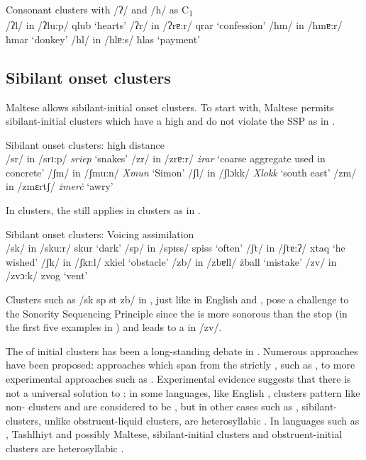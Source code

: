 \documentclass[output=paper]{langsci/langscibook}
\begin{document}
\ea\label{ex:galea:4a}
{Consonant clusters with /ʔ/ and /h/ as C\textsubscript{1}}\\
\ea
/ʔl/ in /ʔlu:p/ qlub ‘hearts’
\ex
/ʔr/ in /ʔrɐ:r/ qrar ‘confession’
\ex
/hm/ in /hmɐ:r/ ħmar ‘donkey’
\ex
/hl/ in /hlɐ:s/ ħlas ‘payment’ 
\z
\z

\subsection{Sibilant onset clusters}
Maltese allows sibilant-initial onset clusters. To start with, Maltese permits sibi\-lant-initial clusters which have a high  and do not violate the SSP as in .


\ea\label{ex:galea:4}
{Sibilant onset clusters: high  distance}\\
\ea
/sr/ in /srɪ:p/ \textit{sriep} ‘snakes’
\ex
/zr/ in /zrɐ:r/ \textit{żrar} ‘coarse aggregate used in concrete’ 
\ex
/ʃm/ in /ʃmu:n/ \textit{Xmun} ‘Simon’
\ex
/ʃl/ in /ʃlɔkk/ \textit{Xlokk} ‘south east’ 
\ex
/zm/ in /zmɛrtʃ/ \textit{żmer\.c} ‘awry’
\z
\z

In   clusters, the  still applies in  clusters as in .

\largerpage
\ea\label{ex:galea:5}
{Sibilant onset clusters: Voicing assimilation}\\
\ea
/sk/ in /sku:r/ skur ‘dark’
\ex
/sp/ in /spɪss/ spiss ‘often’
\ex
/ʃt/ in  /ʃtɐ:ʔ/  xtaq ‘he wished’
\ex
/ʃk/ in /ʃkɪ:l/ xkiel ‘obstacle’
\ex
/zb/ in /zbɐll/ żball ‘mistake’
\ex
/zv/ in /zvɔ:k/ zvog ‘vent’ 
\z
\z
\newpage

Clusters such as /sk sp st zb/ in , just like in English and , pose a challenge to the Sonority Sequencing Principle since the  is more sonorous than the stop (in the first five examples in ) and leads to a  in /zv/.  

The  of  initial clusters has been a long-standing debate in . Numerous approaches have been proposed: approaches which span from the strictly , such as \citet{kaye1992you}, to more experimental approaches such as \citet{browman1992}. Experimental evidence suggests that there is not a universal solution to : in some languages, like English \citep{marin2010},  clusters pattern like non- clusters and are considered to be , but in other cases such as , sibilant- clusters, unlike obstruent-liquid clusters, are heterosyllabic \citep{hermes2013}. In languages such as  , Tashlhiyt  and possibly Maltese, sibilant-initial clusters and obstruent-initial clusters are heterosyllabic \citep[see][for a preliminary articulatory study]{hermesetal}.
\end{document}
